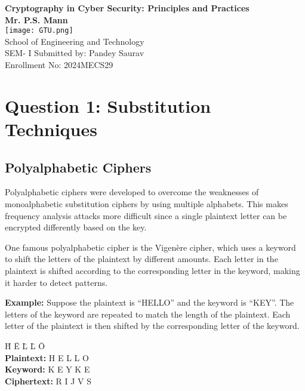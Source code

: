 \documentclass[a4paper,12pt]{article}
\begin{document}
\begin{titlepage}
    \centering
    \vspace*{2cm}
    {\LARGE \bfseries Cryptography in Cyber Security: Principles and Practices}\\[1.5cm] %
    {\Large \textbf{Mr. P.S. Mann}}\\[1cm]  %
    \vspace{1.5cm}
    \texttt{[image: GTU.png]}\\[1.5cm] %
    {\LARGE School of Engineering and Technology}\\[0.5cm]
    \large{SEM- I}
    \vfill  %
    {\small Submitted by: Pandey Saurav}\\ %
    {\small Enrollment No: 2024MECS29}\\
    \vspace*{2cm}
    \date{}  %
\end{titlepage}

\newpage

\section*{Question 1: Substitution Techniques}

\subsection*{Polyalphabetic Ciphers}
Polyalphabetic ciphers were developed to overcome the weaknesses of monoalphabetic substitution ciphers by using multiple alphabets. This makes frequency analysis attacks more difficult since a single plaintext letter can be encrypted differently based on the key.

One famous polyalphabetic cipher is the Vigenère cipher, which uses a keyword to shift the letters of the plaintext by different amounts. Each letter in the plaintext is shifted according to the corresponding letter in the keyword, making it harder to detect patterns.

\textbf{Example:} Suppose the plaintext is ``HELLO'' and the keyword is ``KEY''. The letters of the keyword are repeated to match the length of the plaintext. Each letter of the plaintext is then shifted by the corresponding letter of the keyword.

\begin{tabbing}
\hspace{3cm} \= H \= E \= L \= L \= O \\
\textbf{Plaintext:} \> H \> E \> L \> L \> O \\
\textbf{Keyword:}  \> K \> E \> Y \> K \> E \\
\textbf{Ciphertext:} \> R \> I \> J \> V \> S
\end{tabbing}
\end{document}
